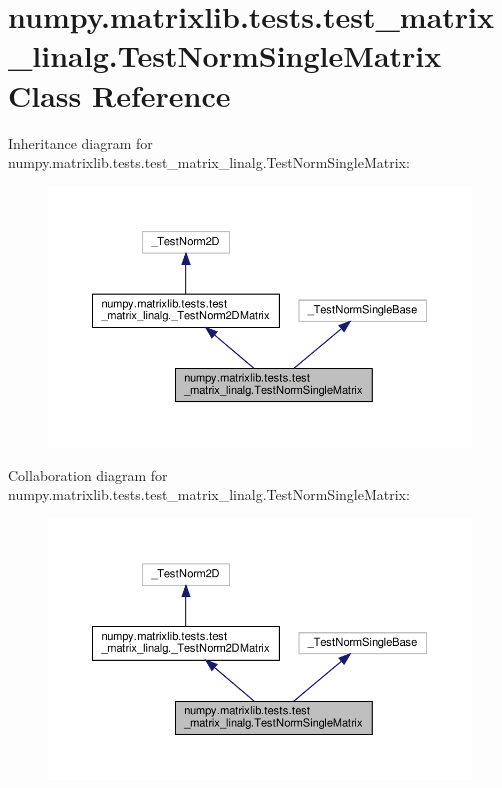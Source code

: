 \hypertarget{classnumpy_1_1matrixlib_1_1tests_1_1test__matrix__linalg_1_1TestNormSingleMatrix}{}\section{numpy.\+matrixlib.\+tests.\+test\+\_\+matrix\+\_\+linalg.\+Test\+Norm\+Single\+Matrix Class Reference}
\label{classnumpy_1_1matrixlib_1_1tests_1_1test__matrix__linalg_1_1TestNormSingleMatrix}


Inheritance diagram for numpy.\+matrixlib.\+tests.\+test\+\_\+matrix\+\_\+linalg.\+Test\+Norm\+Single\+Matrix\+:
\nopagebreak
\begin{figure}[H]
\begin{center}
\leavevmode
\includegraphics[width=350pt]{classnumpy_1_1matrixlib_1_1tests_1_1test__matrix__linalg_1_1TestNormSingleMatrix__inherit__graph}
\end{center}
\end{figure}


Collaboration diagram for numpy.\+matrixlib.\+tests.\+test\+\_\+matrix\+\_\+linalg.\+Test\+Norm\+Single\+Matrix\+:
\nopagebreak
\begin{figure}[H]
\begin{center}
\leavevmode
\includegraphics[width=350pt]{classnumpy_1_1matrixlib_1_1tests_1_1test__matrix__linalg_1_1TestNormSingleMatrix__coll__graph}
\end{center}
\end{figure}

